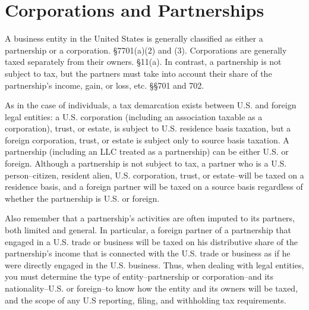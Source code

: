 
\section{Corporations and Partnerships}

A business entity in the United States is generally classified as either a partnership or a corporation.  \S 7701(a)(2) and (3).  Corporations are generally taxed separately from their owners.  \S 11(a).  In contrast, a partnership is not subject to tax, but the partners must take into account their share of the partnership's income, gain, or loss, etc.  \S\S 701 and 702.

As in the case of individuals, a tax demarcation exists between U.S. and foreign legal entities:  a U.S. corporation (including an association taxable as a corporation), trust, or estate, is subject to U.S. residence basis taxation, but a foreign corporation, trust, or estate is subject only to source basis taxation.     A partnership (including an LLC treated as a partnership) can be either U.S. or foreign.  Although a partnership is not subject to tax, a partner who is a U.S. person--citizen, resident alien, U.S. corporation, trust, or estate--will be taxed on a residence basis, and a foreign partner will be taxed on a source basis regardless of whether the partnership is U.S. or foreign.

Also remember that a partnership's activities are often imputed to its partners, both limited and general.  In particular, a foreign partner of a partnership that engaged in a U.S. trade or business will be taxed on his distributive share of the partnership's income that is connected with the U.S. trade or business as if he were directly engaged in the U.S. business.  Thus, when dealing with legal entities, you must determine the type of entity--partnership or corporation--and its nationality--U.S. or foreign--to know how the entity and its owners will be taxed, and the scope of any U.S reporting, filing, and withholding tax requirements.


